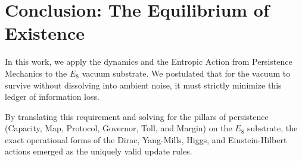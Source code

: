 \section{Conclusion: The Equilibrium of Existence}

In this work, we apply the dynamics and the Entropic Action from Persistence Mechanics to the $E_8$ vacuum substrate. We postulated that for the vacuum to survive without dissolving into ambient noise, it must strictly minimize this ledger of information loss. 

By translating this requirement and solving for the pillars of persistence (Capacity, Map, Protocol, Governor, Toll, and Margin) on the $E_8$ substrate, the exact operational forms of the Dirac, Yang-Mills, Higgs, and Einstein-Hilbert actions emerged as the uniquely valid update rules. 

